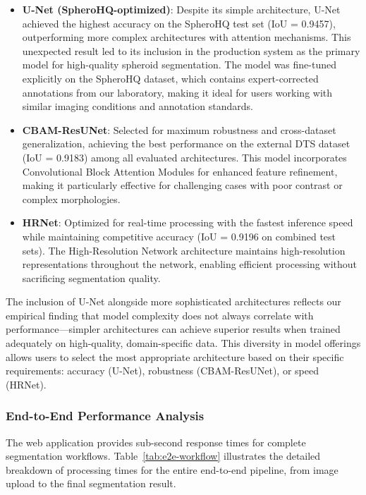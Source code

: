 \documentclass[preprint,12pt]{elsarticle}
\newcommand{\dsHQ}{SpheroHQ}
\newcommand{\dsDTS}{DTS}
\begin{document}
\begin{itemize}\setlength\itemsep{-0.2em}
    \item \textbf{U-Net (\dsHQ-optimized)}: Despite its simple architecture, U-Net achieved the highest accuracy on the \dsHQ{} test set (IoU = 0.9457), outperforming more complex architectures with attention mechanisms. This unexpected result led to its inclusion in the production system as the primary model for high-quality spheroid segmentation. The model was fine-tuned explicitly on the \dsHQ{} dataset, which contains expert-corrected annotations from our laboratory, making it ideal for users working with similar imaging conditions and annotation standards.
    
    \item \textbf{CBAM-ResUNet}: Selected for maximum robustness and cross-dataset generalization, achieving the best performance on the external \dsDTS{} dataset (IoU = 0.9183) among all evaluated architectures. This model incorporates Convolutional Block Attention Modules for enhanced feature refinement, making it particularly effective for challenging cases with poor contrast or complex morphologies.
    
    \item \textbf{HRNet}: Optimized for real-time processing with the fastest inference speed while maintaining competitive accuracy (IoU = 0.9196 on combined test sets). The High-Resolution Network architecture maintains high-resolution representations throughout the network, enabling efficient processing without sacrificing segmentation quality.
\end{itemize}

The inclusion of U-Net alongside more sophisticated architectures reflects our empirical finding that model complexity does not always correlate with performance—simpler architectures can achieve superior results when trained adequately on high-quality, domain-specific data. This diversity in model offerings allows users to select the most appropriate architecture based on their specific requirements: accuracy (U-Net), robustness (CBAM-ResUNet), or speed (HRNet).

\subsubsection{End-to-End Performance Analysis}
The web application provides sub-second response times for complete segmentation workflows. Table~\ref{tab:e2e-workflow} illustrates the detailed breakdown of processing times for the entire end-to-end pipeline, from image upload to the final segmentation result.
\end{document}
